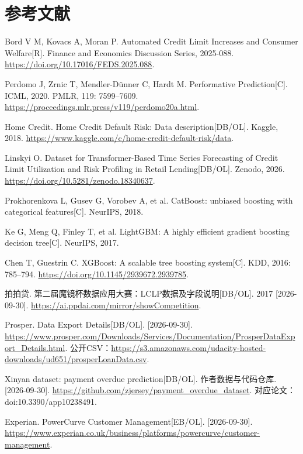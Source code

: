 \documentclass[a4paper,10pt]{article}
\begin{document}
\clearpage{}\section*{参考文献}
\begingroup\fontsize{9.5bp}{13bp}\selectfont
\begin{enumerate}[label={[\arabic*]},leftmargin=1.9em,itemsep=5bp,parsep=0pt]
\item Bord V M, Kovacs A, Moran P. Automated Credit Limit Increases and Consumer Welfare[R]. Finance and Economics Discussion Series, 2025-088. \url{https://doi.org/10.17016/FEDS.2025.088}.
\item Perdomo J, Zrnic T, Mendler-Dünner C, Hardt M. Performative Prediction[C]. ICML, 2020. PMLR, 119: 7599--7609. \url{https://proceedings.mlr.press/v119/perdomo20a.html}.
\item Home Credit. Home Credit Default Risk: Data description[DB/OL]. Kaggle, 2018. \url{https://www.kaggle.com/c/home-credit-default-risk/data}.
\item Linskyi O. Dataset for Transformer-Based Time Series Forecasting of Credit Limit Utilization and Risk Profiling in Retail Lending[DB/OL]. Zenodo, 2026. \url{https://doi.org/10.5281/zenodo.18340637}.
\item Prokhorenkova L, Gusev G, Vorobev A, et al. CatBoost: unbiased boosting with categorical features[C]. NeurIPS, 2018.
\item Ke G, Meng Q, Finley T, et al. LightGBM: A highly efficient gradient boosting decision tree[C]. NeurIPS, 2017.
\item Chen T, Guestrin C. XGBoost: A scalable tree boosting system[C]. KDD, 2016: 785--794. \url{https://doi.org/10.1145/2939672.2939785}.
\item 拍拍贷. 第二届魔镜杯数据应用大赛：LCLP数据及字段说明[DB/OL]. 2017 [2026-09-30]. \url{https://ai.ppdai.com/mirror/showCompetition}.
\item Prosper. Data Export Details[DB/OL]. [2026-09-30]. \url{https://www.prosper.com/Downloads/Services/Documentation/ProsperDataExport_Details.html}. 公开CSV：\url{https://s3.amazonaws.com/udacity-hosted-downloads/ud651/prosperLoanData.csv}.
\item Xinyan dataset: payment overdue prediction[DB/OL]. 作者数据与代码仓库. [2026-09-30]. \url{https://github.com/zjersey/payment_overdue_dataset}. 对应论文：doi:10.3390/app10238491.
\item Experian. PowerCurve Customer Management[EB/OL]. [2026-09-30]. \url{https://www.experian.co.uk/business/platforms/powercurve/customer-management}.

\end{enumerate}
\end{document}
